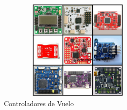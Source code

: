 \vspace{5 px}

\begin{figure}[H]
    \centering
    \includegraphics[width=8cm, height=5cm]{Imagenes/Marco Teorico/flight controller.jpg}
    \caption{Controladores de Vuelo \cite{controladores}}
    \label{fig:enter-label}
\end{figure}










